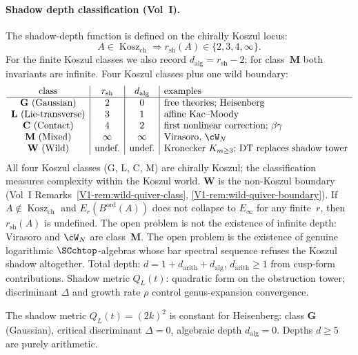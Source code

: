 \paragraph{Shadow depth classification (Vol~I).}
The shadow-depth function is defined on the chirally Koszul locus:
\[
A\in\operatorname{Kosz}_{\mathrm{ch}}
\Longrightarrow r_{\mathrm{sh}}(A)\in\{2,3,4,\infty\}.
\]
For the finite Koszul classes we also record
$d_{\mathrm{alg}}=r_{\mathrm{sh}}-2$; for class~$\mathbf M$ both
invariants are infinite. Four Koszul classes plus one wild boundary:
\[
 \begin{array}{c|c|c|l}
 \text{class} & r_{\mathrm{sh}} & d_{\mathrm{alg}} & \text{examples} \\
 \hline
 \mathbf{G}\ \text{(Gaussian)} & 2 & 0 &
 \text{free theories; Heisenberg} \\
 \mathbf{L}\ \text{(Lie-transverse)} & 3 & 1 &
 \text{affine Kac--Moody} \\
 \mathbf{C}\ \text{(Contact)} & 4 & 2 &
 \text{first nonlinear correction; } \beta\gamma \\
 \mathbf{M}\ \text{(Mixed)} & \infty & \infty &
 \text{Virasoro, } \cW_N \\
 \mathbf{W}\ \text{(Wild)} & \text{undef.} & \text{undef.} &
 \text{Kronecker } K_{m \ge 3}\text{; DT replaces shadow tower}
 \end{array}
\]
All four Koszul classes (G, L, C, M) are chirally Koszul; the
classification measures complexity within the Koszul world.
$\mathbf{W}$ is the non-Koszul boundary
(Vol~I Remarks~\ref{V1-rem:wild-quiver-class},
\ref{V1-rem:wild-quiver-boundary}). If
$A\notin\operatorname{Kosz}_{\mathrm{ch}}$ and
$E_r(B^{\mathrm{ord}}(A))$ does not collapse to $E_\infty$ for any
finite~$r$, then $r_{\mathrm{sh}}(A)$ is undefined. The open problem
is not the existence of infinite depth: Virasoro and $\cW_N$ are
class~$\mathbf M$. The open problem is the existence of genuine
logarithmic $\SCchtop$-algebras whose bar spectral sequence refuses
the Koszul shadow altogether.
Total depth: $d = 1 + d_{\mathrm{arith}} + d_{\mathrm{alg}}$,
$d_{\mathrm{arith}} \ge 1$ from cusp-form contributions.
Shadow metric $Q_L(t)$: quadratic form on the obstruction tower;
discriminant $\Delta$ and growth rate $\rho$ control
genus-expansion convergence.

The shadow metric $Q_L(t) = (2k)^2$ is constant for Heisenberg:
class $\mathbf{G}$ (Gaussian), critical discriminant $\Delta = 0$,
algebraic depth $d_{\mathrm{alg}} = 0$. Depths $d \geq 5$ are
purely arithmetic.

